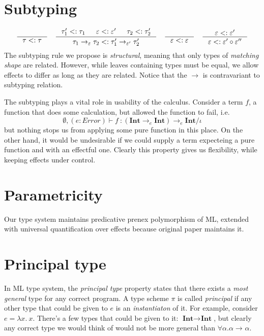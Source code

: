 \documentclass[declaration,shortabstract]{iithesis}
\newcommand{\types}[4][\Gamma;\Theta]{\ensuremath{{{#1} \vdash {#2} \: : {#3}/{#4}}}}
\newcommand{\arrow}[3]{{#1}\rightarrow_{#2}{#3}}
\newcommand{\lam}[1][x]{\ensuremath{\lambda #1.\:}}
\begin{document}
\section{Subtyping}
\begin{gather*}
\begin{gathered}
\inference{}{\tau <: \tau}
\quad
\inference{
    \tau_1' <: \tau_1 & \varepsilon <: \varepsilon' & \tau_2 <: \tau_2'
}{
    \arrow{\tau_1}{\varepsilon}{\tau_2} <: \arrow{\tau_1'}{\varepsilon'}{\tau_2'}
} 
\quad
\inference{}{\varepsilon <: \varepsilon}
\quad
\inference{
    \varepsilon <: \varepsilon'
}{
    \varepsilon <: \varepsilon' \circ \varepsilon''
}
\end{gathered}
\end{gather*}
\setlength{\jot}{3pt}
The subtyping rule we propose is \textit{structural}, meaning that only types of
\textit{matching shape} are related.
However, while leaves containing types must be equal, we allow effects to differ as long as they are related.
Notice that the $\rightarrow$ is contravariant to subtyping relation.

The subtyping plays a vital role in usability of the calculus.
Consider a term $f$, a function that does some calculation,
but allowed the function to fail, i.e.
$$
\types[\emptyset, (e: Error)]
    {f}
    {\arrow{(\arrow{\textbf{Int}}{e}{\textbf{Int}})}{e}{\textbf{Int}}}
    {\iota}
$$
but nothing stops us from applying some pure function in this place.
On the other hand, it would be undesirable if we could supply a term expecteing
a pure function and with an effectful one.
Clearly this property gives us flexibility, while keeping effects under control.


\section{Parametricity}
Our type system maintains predicative prenex polymorphism of ML,
extended with universal quantification over effects because original paper maintains it.


\section{Principal type}
In ML type system, the \textit{principal type} property states that there exists
a \textit{most general} type for any correct program\cite{principal}. 
A type scheme $\pi$ is called \textit{principal} if any other type that
could be given to $e$ is an \textit{instantiaton} of it.
For example, consider $e = \lam x$.
There's a few types that could be given to it: $\arrow{\textbf{Int}}{}{\textbf{Int}}$, 
but clearly any correct type we would think of would not be more general than $\forall \alpha . \arrow{\alpha}{}{\alpha}$.
\end{document}
